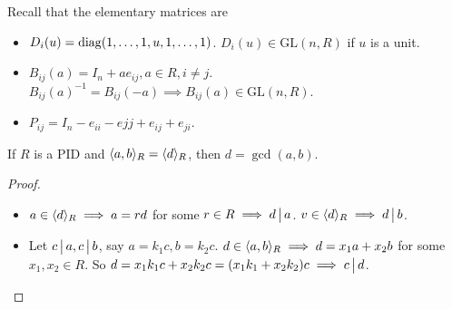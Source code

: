 Recall that the elementary matrices are
\begin{itemize}
  \item $D_i(u) = \operatorname{diag}(1,\dots,1,u,1, \dots,1)$.
    $D_i(u) \in \text{GL}(n, R)$ if $u$ is a unit.
  \item $B_{ij}(a) = I_n + ae_{ij}, a\in R, i \ne j$.
    $B_{ij}(a)^{-1} = B_{ij}(-a) \implies B_{ij}(a) \in \text{GL}(n, R)$.
  \item $P_{ij} = I_n - e_{ii} - e{jj} + e_{ij} + e_{ji}$.
\end{itemize}

\begin{fact}
  If $R$ is a PID and $\langle a, b\rangle_R = \langle d\rangle_R$, then $d = \gcd(a, b)$.
  \begin{proof} \mbox{}
    \begin{itemize}
      \item
        $a \in \langle d\rangle_R \implies a = rd$ for some $r \in R \implies d \,\big|\, a$.
        $v \in \langle d\rangle_R \implies d \,\big|\, b$.
      \item Let $c \,\big|\, a, c \,\big|\, b$, say $a = k_1c, b = k_2c$.
      $d \in \langle a, b\rangle_R \implies d = x_1a + x_2b$ for some $x_1, x_2 \in R$.
      So $d = x_1k_1c + x_2k_2c = (x_1k_1 + x_2k_2)c \implies c \,\big|\, d$.
      \qedhere
    \end{itemize}
  \end{proof}
\end{fact}

